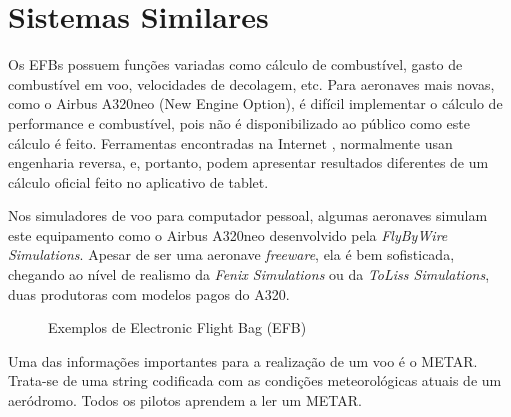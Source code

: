 \chapter{Sistemas Similares}
Os EFBs possuem funções variadas como cálculo de combustível, gasto de combustível
em voo, velocidades de decolagem, etc. \cite{wired-efb} Para aeronaves mais novas, como o Airbus 
A320neo (New Engine Option), é difícil implementar o cálculo de performance e combustível, pois não 
é disponibilizado ao público como este cálculo é feito. Ferramentas encontradas 
na Internet \cite{a320-perf}, normalmente usan engenharia reversa, e, portanto, 
podem apresentar resultados diferentes de um cálculo oficial feito no aplicativo
de tablet.

Nos simuladores de voo para computador pessoal, algumas aeronaves simulam
este equipamento como o Airbus A320neo desenvolvido pela \textit{FlyByWire Simulations}. 
Apesar de ser uma aeronave \textit{freeware}, ela é bem sofisticada, chegando ao 
nível de realismo da \textit{Fenix Simulations} ou da \textit{ToLiss Simulations}, 
duas produtoras com modelos pagos do A320.

\begin{figure}%
    \centering
    \qquad
    \caption{Exemplos de Electronic Flight Bag (EFB)}
    \label{fig:example}%
\end{figure}

Uma das informações importantes para a realização de um voo é o METAR. Trata-se 
de uma string codificada com as condições meteorológicas atuais de um aeródromo. 
Todos os pilotos aprendem a ler um METAR.

